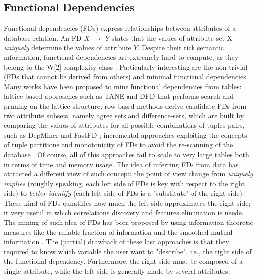 \subsection{Functional Dependencies}\label{fds}
Functional dependencies (FDs) express relationships between attributes of a database relation. An FD $X$ $\rightarrow$ $Y$ states that the values of attribute set X \textit{uniquely} determine the values of attribute $Y$. Despite their rich semantic information, functional dependencies are extremely hard to compute, as they belong to the W[2] complexity class \cite{blasius2017parameterized}. Particularly interesting are the non-trivial (FDs that cannot be derived from others) and minimal functional dependencies. Many works have been proposed to mine functional dependencies from tables: lattice-based approaches such as TANE \cite{huhtala1999tane} and DFD \cite{abedjan2014dfd} that performs search and pruning on the lattice structure; row-based methods derive candidate FDs from two attribute subsets, namely agree sets and difference-sets, which are built by comparing the values of attributes for all possible combinations of tuples pairs, such as DepMiner \cite{lopes2000efficient} and FastFD \cite{wyss2001fastfds}; incremental approaches exploiting the concepts of tuple partitions and monotonicity of FDs to avoid the re-scanning of the database \cite{wang2001incremental}. Of course, all of this approaches fail to scale to very large tables both in terms of time and memory usage. The idea of inferring FDs from data has attracted a different view of such concept: the point of view change from \textit{uniquely implies} (roughly speaking, each left side of FDs is key with respect to the right side) to \textit{better identify} (each left side of FDs is a "substitute" of the right side). These kind of FDs qunatifies how much the left side approximates the right side; it very useful in which correlations discovery and features elimination is neede. The mining of such idea of FDs has been proposed by using information theoretic measures like the reliable fraction of information \cite{mandros2017discovering} and the smoothed mutual information \cite{pennerath2020discovering}. The (partial) drawback of these last approaches is that they required to know which variable the user want to "describe", i.e., the right side of the functional dependency. Furthermore, the right side must be composed of a single attribute, while the left side is generally made by several attributes.


